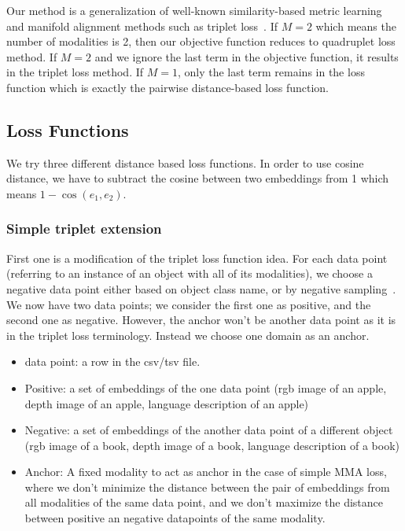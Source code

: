 \documentclass[11pt]{article}
\begin{document}
Our method is a generalization of well-known similarity-based metric learning and manifold alignment methods such as triplet loss~\cite{Carvalho-cooking-triplet,triplet_loss_2021_CVPR}.
If $M=2$ which means the number of modalities is 2, then our objective function reduces to quadruplet loss method.
If $M=2$ and we ignore the last term in the objective function, it results in the triplet loss method. 
If $M=1$, only the last term remains in the loss function which is exactly the pairwise distance-based loss function.


\subsection{Loss Functions}
We try three different distance based loss functions.
In order to use cosine distance, we have to subtract the cosine between two embeddings from 1 which means $1 - \cos(e_1, e_2)$.

\subsubsection{Simple triplet extension}
\label{sub:simple-mma}

First one is a modification of the triplet loss function idea. For each data point (referring to an instance of an object with all of its modalities), we choose a negative data point either based on object class name, or by negative sampling~\cite{Pillai_Matuszek_2018}. We now have two data points; we consider the first one as positive, and the second one as negative. However, the anchor won't be another data point as it is in the triplet loss terminology. Instead we choose one domain as an anchor. 

\begin{itemize}
    \item data point: a row in the csv/tsv file.
    \item Positive: a set of embeddings of the one data point (rgb image of an apple, depth image of an apple, language description of an apple)
    \item Negative: a set of embeddings of the another data point of a different object (rgb image of a book, depth image of a book, language description of a book)
    \item Anchor: A fixed modality to act as anchor in the case of simple MMA loss, where we don't minimize the distance between the pair of embeddings from all modalities of the same data point, and we don't maximize the distance between positive an negative datapoints of the same modality.
\end{itemize}
\end{document}
